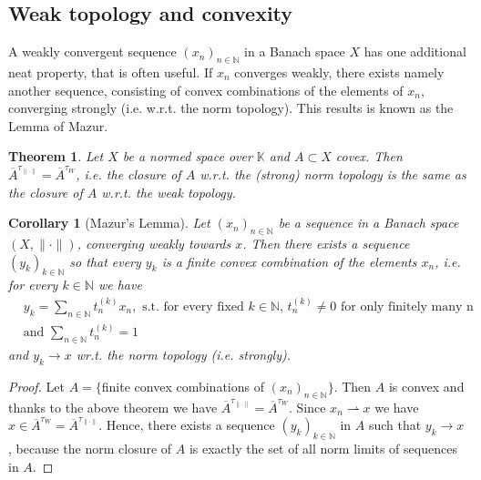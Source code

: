\documentclass[11pt,a4paper]{article}
\newtheorem{thm}{Theorem}[section]
\newtheorem{cor}{Corollary}[section]
\theoremstyle{definition}
\newcommand{\wto}{\rightharpoonup}
\begin{document}
\subsection{Weak topology and convexity}
A weakly convergent sequence $(x_n)_{n \in \mathbb{N}}$ in a Banach space $X$ has one additional neat property, that is often useful. If $x_n$ converges weakly, there exists namely another sequence, consisting of convex combinations of the elements of $x_n$, converging strongly (i.e. w.r.t. the norm topology). This results is known as the Lemma of Mazur. 
\begin{thm} Let $X$ be a normed space over $\mathbb{K}$ and $A \subset X$ covex. Then $\overline{A}^{\tau_{\| \cdot \|}} = \overline{A}^{ \tau_W}$, i.e. the closure of $A$ w.r.t. the (strong) norm topology is the same as the closure of $A$ w.r.t. the weak topology. 
\end{thm}
\begin{cor}[Mazur's Lemma] Let $(x_n)_{n \in \mathbb{N}}$ be a sequence in a Banach space $(X, \| \cdot \|)$, converging weakly towards $x$. Then there exists a sequence $(y_k)_{k \in \mathbb{N}}$ so that every $y_k$ is a finite convex combination of the elements $x_n$, i.e. for every $k \in \mathbb{N}$ we have
\begin{align*}
&y_k = \sum_{n \in \mathbb{N}} t_n^{(k)} x_n, \text{ s.t. for every fixed $k \in \mathbb{N}$, } t_n^{(k)} \neq 0 \text{ for only finitely many n} \\
&\text{and } \sum_{n \in \mathbb{N}} t_n^{(k)} = 1
\end{align*}
and $y_k \to x$ wr.t. the norm topology (i.e. strongly). 
\end{cor}
\begin{proof}
Let $A= \lbrace$finite convex combinations of $(x_n)_{n \in \mathbb{N}} \rbrace$. Then $A$ is convex and thanks to the above theorem we have $\overline{A}^{ \tau_{ \| \cdot \|}} = \overline{A}^{ \tau_W}$. Since $x_n \wto x $ we have $x \in \overline{A}^{ \tau_W}=\overline{A}^{ \tau_{ \| \cdot \|}}$. Hence, there exists a sequence $(y_k)_{k \in \mathbb{N}}$ in $A$ such that $y_k \to x$, because the norm closure of $A$ is exactly the set of all norm limits of sequences in $A$. 
\end{proof}
\end{document}
